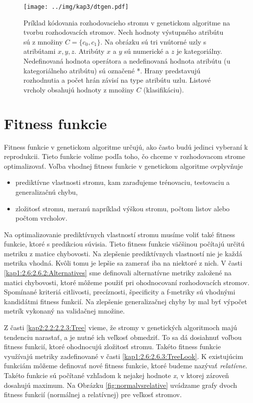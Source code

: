 \begin{figure}[h]
\centering
\centerline{\mbox{\texttt{[image: ../img/kap3/dtgen.pdf]}}}
\caption{Príklad kódovania rozhodovacieho stromu v genetickom algoritme na tvorbu rozhodovacích stromov. Nech hodnoty výstupného atribútu sú z množiny $C=\{c_0,c_1\}$. Na obrázku sú tri vnútorné uzly s atribútami $x,y,z$. Atribúty $x$ a $y$ sú numerické a $z$ je kategoriálny. Nedefinovaná hodnota operátora a nedefinovaná hodnota atribútu (u kategoriálneho atribútu) sú označené *. Hrany predstavujú rozhodnutia a počet hrán závisí na type atribútu uzlu. Listové vrcholy obsahujú hodnoty z množiny $C$ (klasifikáciu).}\label{fig:DTEncode}
\end{figure}

\section{Fitness funkcie}\label{kap3:3.3:Fitness}
Fitness funkcie v genetickom algoritme určujú, ako často budú jedinci vyberaní k reprodukcii. Tieto funkcie volíme podľa toho, čo chceme v rozhodovacom strome optimalizovať. Voľba vhodnej fitness funkcie v genetickom algoritme ovplyvňuje
\begin{itemize}
\item prediktívne vlastnosti stromu, kam zaraďujeme trénovaciu, testovaciu a generalizačnú chybu, 
\item zložitosť stromu, meranú napríklad výškou stromu, počtom listov alebo počtom vrcholov.
\end{itemize} 

Na optimalizovanie prediktívnych vlastností stromu musíme voliť také fitness funkcie, ktoré s predikciou súvisia. Tieto fitness funkcie väčšinou počítajú určitú metriku z matice chybovosti. Na zlepšenie prediktívnych vlastností nie je každá metrika vhodná. Kvôli tomu je lepšie sa zamerať iba na niektoré z nich.
V časti \ref{kap1:2.6:2.6.2:Alternatives} sme definovali alternatívne metriky založené na matici chybovosti, ktoré môžeme použiť pri ohodnocovaní rozhodovacích stromov. Spomínané kriteriá citlivosti, precíznosti, špecificity a f-metriky sú vhodnými kandidátmi fitness funkcií. Na zlepšenie generalizačnej chyby by mal byť výpočet metrík vykonaný na validačnej množine.

Z časti \ref{kap2:2.2:2.2.3:Tree} vieme, že stromy v genetických algoritmoch majú tendenciu narastať, a je nutné ich veľkosť obmedziť. To sa dá dosiahnuť voľbou fitness funkcií, ktoré ohodnocujú zložitosť stromu. Takéto fitness funkcie využívajú metriky zadefinované v časti \ref{kap1:2.6:2.6.3:TreeLook}. K existujúcim funkciám môžeme definovať nové fitness funkcie, ktoré budeme nazývať \emph{relatívne}. Takéto funkcie sú počítané vzhľadom k nejakej hodnote \emph{x}, v ktorej zároveň dosahujú maximum. Na Obrázku \ref{fig:normalvsrelative} uvádzame grafy dvoch fitness funkcií (normálnej a relatívnej) pre veľkosť stromov.

